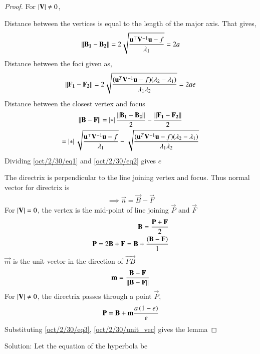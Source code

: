 \begin{proof}
For $\left\vert\mathbf{V}\right\vert\neq 0$,

Distance between the vertices is equal to the length of the major axis. That gives,
\begin{align}
    \label{oct/2/30/eq1} \left\lVert\mathbf{B_1}-\mathbf{B_2}\right\rVert = 2\sqrt{\frac{\mathbf{u}^{\top}\mathbf{V}^{-1}\mathbf{u} -f}{\lambda_1}} = 2a
\end{align}
Distance between the foci given as,
\begin{align}
    \label{oct/2/30/eq2} \left\lVert\mathbf{F_1}-\mathbf{F_2}\right\rVert = 2\sqrt{\frac{(\mathbf{u}^T\mathbf{V}^{-1}\mathbf{u}-f)(\lambda_2-\lambda_1)}{\lambda_1\lambda_2}} = 2ae
\end{align}
Distance between the closest vertex and focus
\begin{multline}
    \label{oct/2/30/eq3} \left\lVert\mathbf{B}-\mathbf{F}\right\rVert = \left\vert*\right\vert{ \frac{\left\lVert\mathbf{B_1}-\mathbf{B_2}\right\rVert}{2} - \frac{\left\lVert\mathbf{F_1}-\mathbf{F_2}\right\rVert}{2}}\\
    = \left\vert*\right\vert{\sqrt{\frac{\mathbf{u}^{\top}\mathbf{V}^{-1}\mathbf{u} -f}{\lambda_1}} - \sqrt{\frac{(\mathbf{u}^T\mathbf{V}^{-1}\mathbf{u}-f)(\lambda_2-\lambda_1)}{\lambda_1\lambda_2}}}
\end{multline}
Dividing \eqref{oct/2/30/eq1} and \eqref{oct/2/30/eq2} gives $e$

The directrix is perpendicular to the line joining vertex and focus. Thus normal vector for directrix is
\begin{align}
    \implies \vec{n} = \vec{B}-\vec{F}
\end{align}
For $\left\vert\mathbf{V}\right\vert = 0$, the vertex is the mid-point of line joining $\vec{P}$ and $\vec{F}$
\begin{align}
    \mathbf{B} = \frac{\mathbf{P}+\mathbf{F}}{2}\\
    \mathbf{P} = 2\mathbf{B} + \mathbf{F} = \mathbf{B} + \frac{\left(\mathbf{B}-\mathbf{F}\right)}{1}
\end{align}
$\vec{m}$ is the unit vector in the direction of $\vec{FB}$
\begin{align}
    \label{oct/2/30/unit_vec} \mathbf{m} = \frac{\mathbf{B}-\mathbf{F}}{\left\lVert\mathbf{B}-\mathbf{F}\right\rVert}
\end{align}
For $\left\vert\mathbf{V}\right\vert \ne 0$, the directrix passes through a point $\vec{P}$,
\begin{align}
    \mathbf{P} = \mathbf{B} + \mathbf{m}\frac{a\left(1-e\right)}{e}
\end{align}
Substituting \eqref{oct/2/30/eq3}, \eqref{oct/2/30/unit_vec} gives the lemma
\end{proof}
Solution: Let the equation of the hyperbola be
